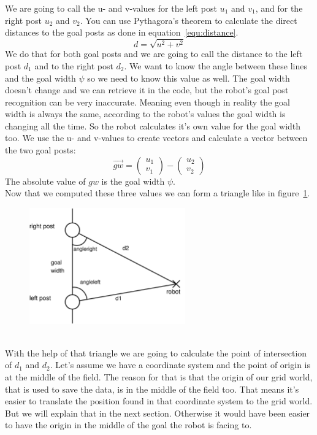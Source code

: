 \documentclass[lnicst,a4paper]{svmultln}
\begin{document}
We are going to call the u- and v-values for the left post \(u_{1}\) and \(v_{1}\), and for the right post \(u_{2}\) and \(v_{2}\). You can use Pythagora's theorem to calculate the direct distances to the goal posts as done in equation~\ref{equ:distance}.
\begin{equation}
	d = \sqrt{u^2+v^2}
	\label{equ:distance}
\end{equation}
We do that for both goal posts and we are going to call the distance to the left post \(d_{1}\) and to the right post \(d_{2}\). We want to know the angle between these lines and the goal width \(\psi\) so we need to know this value as well. The goal width doesn't change and we can retrieve it in the code, but the robot's goal post recognition can be very inaccurate. Meaning even though in reality the goal width is always the same, according to the robot's values the goal width is changing all the time. So the robot calculates it's own value for the goal width too. We use the u- and v-values to create vectors and calculate a vector between the two goal posts:
\begin{equation}
	\vec{gw}=\left(\begin{array}{c} u_{1} \\ v_{1} \end{array}\right) - \left(\begin{array}{c} u_{2} \\ v_{2} \end{array}\right)
\end{equation}
The absolute value of \(gw\) is the goal width \(\psi\).
\\
Now that we computed these three values we can form a triangle like in figure~\ref{fig:triangle}.
\begin{figure}
 	\centerline{\includegraphics[width=0.6\textwidth]{triangle.pdf}}
	{\caption{}\label{fig:triangle}}
\end{figure}
\\
With the help of that triangle we are going to calculate the point of intersection of \(d_{1}\) and \(d_{2}\). Let's assume we have a coordinate system and the point of origin is at the middle of the field. The reason for that is that the origin of our grid world, that is used to save the data, is in the middle of the field too. That means it's easier to translate the position found in that coordinate system to the grid world. But we will explain that in the next section. Otherwise it would have been easier to have the origin in the middle of the goal the robot is facing to.
\end{document}

